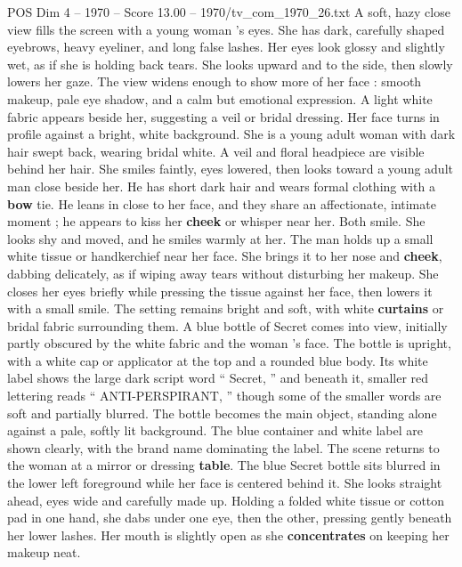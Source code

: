 \begin{textsample}{POS Dim 4 – 1970 – Score 13.00 – 1970/tv\_com\_1970\_26.txt}  \label{ex:f4_pos_086}
A soft, hazy close view fills the screen with a young woman ’s eyes.
She has dark, carefully shaped eyebrows, heavy eyeliner, and long false lashes.
Her eyes look glossy and slightly wet, as if she is holding back tears.
She looks upward and to the side, then slowly lowers her gaze.
The view widens enough to show more of her face : smooth makeup, pale eye shadow, and a calm but emotional expression.
A light white fabric appears beside her, suggesting a veil or bridal dressing.
Her face turns in profile against a bright, white background.
She is a young adult woman with dark hair swept back, wearing bridal white.
A veil and floral headpiece are visible behind her hair.
She smiles faintly, eyes lowered, then looks toward a young adult man close beside her.
He has short dark hair and wears formal clothing with a \textbf{bow} tie.
He leans in close to her face, and they share an affectionate, intimate moment ; he appears to kiss her \textbf{cheek} or whisper near her.
Both smile.
She looks shy and moved, and he smiles warmly at her.
The man holds up a small white tissue or handkerchief near her face.
She brings it to her nose and \textbf{cheek}, dabbing delicately, as if wiping away tears without disturbing her makeup.
She closes her eyes briefly while pressing the tissue against her face, then lowers it with a small smile.
The setting remains bright and soft, with white \textbf{curtains} or bridal fabric surrounding them.
A blue bottle of Secret comes into view, initially partly obscured by the white fabric and the woman ’s face.
The bottle is upright, with a white cap or applicator at the top and a rounded blue body.
Its white label shows the large dark script word “ Secret, ” and beneath it, smaller red lettering reads “ ANTI-PERSPIRANT, ” though some of the smaller words are soft and partially blurred.
The bottle becomes the main object, standing alone against a pale, softly lit background.
The blue container and white label are shown clearly, with the brand name dominating the label.
The scene returns to the woman at a mirror or dressing \textbf{table}.
The blue Secret bottle sits blurred in the lower left foreground while her face is centered behind it.
She looks straight ahead, eyes wide and carefully made up.
Holding a folded white tissue or cotton pad in one hand, she dabs under one eye, then the other, pressing gently beneath her lower lashes.
Her mouth is slightly open as she \textbf{concentrates} on keeping her makeup neat.

\end{textsample}
